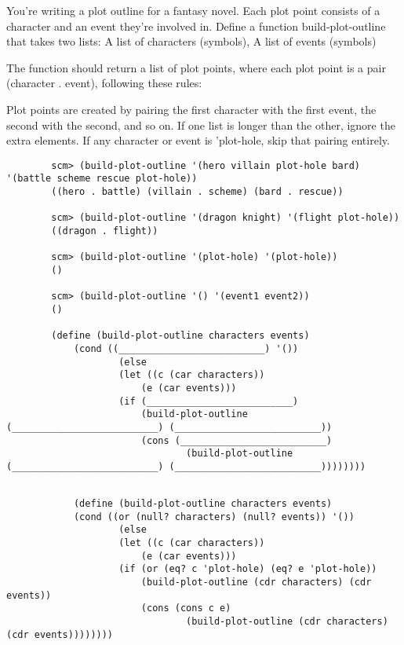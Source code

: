 \begin{blocksection}
    \question You're writing a plot outline for a fantasy novel. Each plot point 
    consists of a character and an event they’re involved in.
    Define a function build-plot-outline that takes two lists: 
        A list of characters (symbols), A list of events (symbols)

    The function should return a list of plot points, where each plot point 
    is a pair (character . event), following these rules:

    Plot points are created by pairing the first character with the first event, the second with the second, and so on.
    If one list is longer than the other, ignore the extra elements.
    If any character or event is 'plot-hole, skip that pairing entirely.
    
    \begin{lstlisting}
        scm> (build-plot-outline '(hero villain plot-hole bard) '(battle scheme rescue plot-hole))
        ((hero . battle) (villain . scheme) (bard . rescue))

        scm> (build-plot-outline '(dragon knight) '(flight plot-hole))
        ((dragon . flight))

        scm> (build-plot-outline '(plot-hole) '(plot-hole))
        ()

        scm> (build-plot-outline '() '(event1 event2))
        ()
        
        (define (build-plot-outline characters events)
            (cond ((__________________________) '())
                    (else
                    (let ((c (car characters))
                        (e (car events)))
                    (if (__________________________)
                        (build-plot-outline (__________________________) (__________________________))
                        (cons (__________________________)
                                (build-plot-outline (__________________________) (__________________________))))))))

    \end{lstlisting}

    \begin{solution}[1in]
        \begin{lstlisting}
            
            (define (build-plot-outline characters events)
            (cond ((or (null? characters) (null? events)) '())
                    (else
                    (let ((c (car characters))
                        (e (car events)))
                    (if (or (eq? c 'plot-hole) (eq? e 'plot-hole))
                        (build-plot-outline (cdr characters) (cdr events))
                        (cons (cons c e)
                                (build-plot-outline (cdr characters) (cdr events))))))))

        \end{lstlisting}
    \end{solution}
    
\end{blocksection}